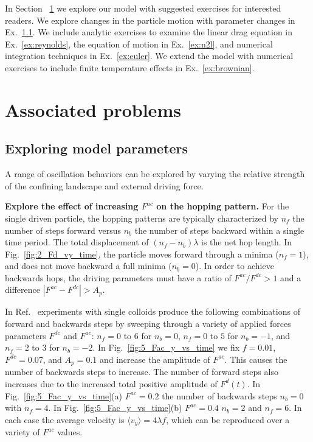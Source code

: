 \documentclass[twocolumn,showpacs,preprintnumbers,amsmath,amssymb,aps,prb]{revtex4}
\begin{document}
In Section ~\ref{sec:problems}
we explore our model
with suggested exercises for interested readers.
We explore changes in the particle motion
with parameter changes in Ex.~\ref{ex:parameters}.
We include analytic exercises to examine the 
linear drag equation in Ex.~\ref{ex:reynolds}, 
the equation of motion in Ex.~\ref{ex:n2l},
and 
numerical integration techniques in Ex.~\ref{ex:euler}.
We extend the model with
numerical exercises 
to include finite temperature effects
in Ex.~\ref{ex:brownian}.

\section{Associated problems}
\label{sec:problems}	

  \subsection{Exploring model parameters}
  \label{ex:parameters}

  A range of oscillation behaviors
  can be explored by varying the
  relative strength of the confining landscape
  and external driving force.

  {\bf Explore the effect of increasing $F^{ac}$ on the hopping pattern.}
  For the single driven particle,
  the hopping patterns are typically characterized
  by $n_f$ the number of steps forward
  versus $n_b$ the number of steps backward within a single
  time period.
  The total displacement of $(n_f - n_b) \lambda$ 
  is the net hop length.  
  In Fig.~\ref{fig:2_Fd_vy_time},
  the particle moves forward through a minima ($n_f = 1$),
  and does not move backward a full minima ($n_b = 0$).  
  In order to achieve
  backwards hops,
  the driving parameters must have
  a ratio of $F^{ac}/F^{dc} > 1$ 
  and a difference $|F^{ac} - F^{dc}| > A_p$.

  In Ref.~\cite{Juniper2015}
  experiments with single colloids 
  produce 
  the following
  combinations of forward and backwards steps
  by sweeping through
  a variety of applied forces parameters $F^{dc}$ and $F^{ac}$:
  $n_f = 0$ to $6$ for $n_b = 0$,
  $n_f = 0$ to $5$ for $n_b = -1$,
  and
  $n_f = 2$ to $3$ for $n_b = -2$.
  In Fig.~\ref{fig:5_Fac_y_vs_time}
  we fix $f=0.01$, $F^{dc}=0.07$, and $A_p = 0.1$
  and increase
  the amplitude of $F^{ac}$.
  This causes the number of backwards steps to increase.
  The number of forward steps also increases
  due to the increased total positive amplitude of $F^d(t)$.
  In Fig.~\ref{fig:5_Fac_y_vs_time}(a) 
  $F^{ac} = 0.2$ %
  the number of backwards steps
  $n_b = 0$ with $n_f = 4$.
  In Fig.~\ref{fig:5_Fac_y_vs_time}(b) $F^{ac} = 0.4$
  $n_b = 2$ and $n_f = 6$.
  In each case the average velocity 
  is $\langle v_y \rangle = 4\lambda f$,
  which can be reproduced over a variety of $F^{ac}$ values.
\end{document}
